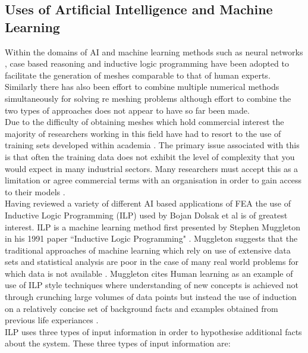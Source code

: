 \subsection{Uses of Artificial Intelligence and Machine Learning}

\noindent
Within the domains of AI and machine learning methods such as neural networks \cite{NeuralNetworks}, case based reasoning \cite{caseBasedReasoning} and inductive logic programming \cite{DolsakPaper94} have been adopted to facilitate the generation of meshes comparable to that of human experts.  Similarly there has also been effort to combine multiple numerical methods simultaneously for solving re meshing problems \cite{TraditionalHybridRefinement} although effort to combine the two types of approaches does not appear to have so far been made.\\ 

\noindent
Due to the difficulty of obtaining meshes which hold commercial interest the majority of researchers working in this field have had to resort to the use of training sets developed within academia \cite{DolsakPaper91}. The primary issue associated with this is that often the training data does not exhibit the level of complexity that you would expect in many industrial sectors. Many researchers must accept this as a limitation or agree commercial terms with an organisation in order to gain access to their models \cite{DittmerMeshQualityMet}.\\ 

\noindent
Having reviewed a variety of different AI based applications of FEA the use of Inductive Logic Programming (ILP) used by Bojan Dolsak et al is of greatest interest. ILP is a machine learning method first presented by Stephen Muggleton in his 1991 paper ``Inductive Logic Programming" \cite{MuggletonILP}. Muggleton suggests that the traditional approaches of machine learning which rely on use of extensive data sets and statistical analysis are poor in the case of many real world problems for which data is not available \cite{ILPYoutubeLecture}. Muggleton cites Human learning as an example of use of ILP style techniques where understanding of new concepts is achieved not through crunching large volumes of data points but instead  the use of induction on a relatively concise set of background facts and examples obtained from previous life experiances \cite{ILPYoutubeLecture}. \\ 

\noindent
ILP uses three types of input information in order to hypothesise additional facts about the system. These three types of input information are: \\ 

